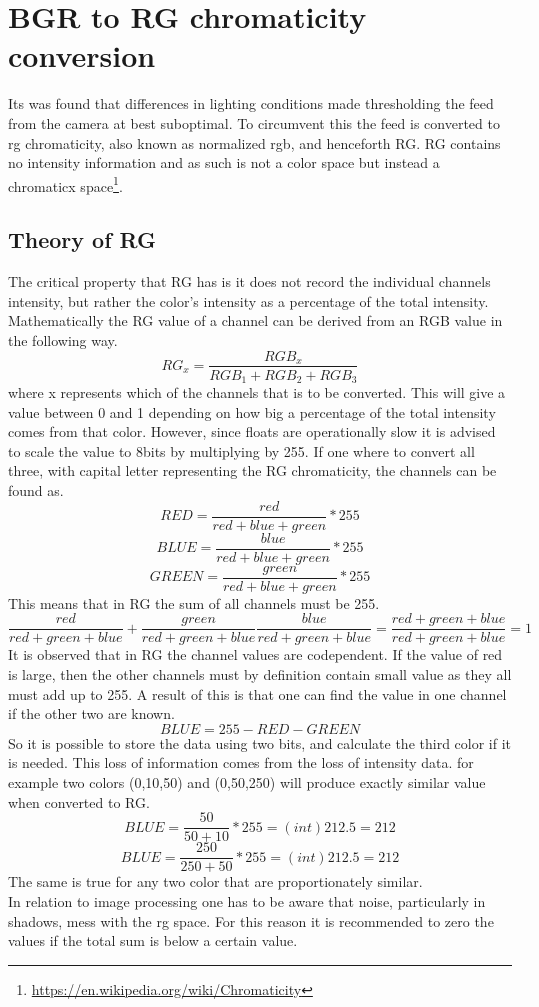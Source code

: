 \section{BGR to RG chromaticity conversion}
Its was found that differences in lighting conditions made thresholding the feed from the camera at best suboptimal. To circumvent this the feed is converted to rg chromaticity, also known as normalized rgb, and henceforth RG. RG contains no intensity information and as such is not a color space but instead a chromaticx  space\footnote{\url{https://en.wikipedia.org/wiki/Chromaticity}}.
\subsection{Theory of RG} 
The critical property that RG has is it does not record the individual channels intensity, but rather the color's intensity as a percentage of the total intensity. Mathematically the RG value of a channel can be derived from an RGB value in the following way.
\[ RG_x = \frac{RGB_x}{RGB_1 + RGB_2 + RGB_3}\]
where x represents which of the channels that is to be converted. This will give a value between 0 and 1 depending on how big a percentage of the total intensity comes from that color. However, since floats are operationally slow it is advised to scale the value to 8bits by multiplying by 255. If one where to convert all three, with capital letter representing the RG chromaticity, the channels can be found as.
\[ RED = \frac{red}{red + blue + green} * 255\]
\[ BLUE = \frac{blue}{red + blue + green} * 255\]
\[ GREEN = \frac{green}{red + blue + green} * 255\]
This means that in RG the sum of all channels must be 255.
\[ \frac{red}{red + green + blue} + \frac{green}{red + green + blue} \frac{blue}{red + green + blue} =  \frac{red + green + blue}{red + green + blue} = 1\]
It is observed that in RG the channel values are codependent. If the value of red is large, then the other channels must by definition contain small value as they all must add up to 255. A result of this is that one can find the value in one channel if the other two are known.
\[ BLUE = 255 - RED - GREEN\]
So it is possible to store the data using two bits, and calculate the third color if it is needed. This loss of information comes from the loss of intensity data\cite{NormRGB}. for example two colors (0,10,50) and (0,50,250) will produce exactly similar value when converted to RG. 
\[ BLUE = \frac{50}{50 + 10} * 255 = (int)212.5 = 212 \]
\[ BLUE = \frac{250}{250 + 50} * 255 = (int)212.5 = 212 \]
The same is true for any two color that are proportionately similar.\\
In relation to image processing one has to be aware that noise, particularly in shadows, mess with the rg space. For this reason it is recommended to zero the values if the total sum is below a certain value.

